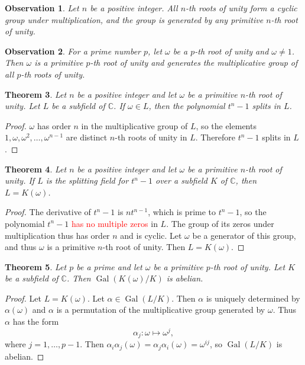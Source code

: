 \documentclass[12pt]{article}
\newtheorem{theorem}{Theorem}
\newtheorem{observation}[theorem]{\textbf{Observation}}
\newcommand{\Gal}{\operatorname{Gal}}
\begin{document}
\begin{observation}
    Let $n$ be a positive integer. All $n$-th roots of unity form a cyclic
    group under multiplication, and the group is generated by any primitive
    $n$-th
    root of unity.
\end{observation}

\begin{observation}
    For a prime number $p$, let $\omega$ be a $p$-th root of unity and $\omega
        \neq 1$. Then $\omega$ is a primitive $p$-th root of unity and
    generates the
    multiplicative group of all $p$-th roots of unity.
\end{observation}

\begin{theorem} \label{thm:unity-1}
    Let $n$ be a positive integer and let $\omega$ be a primitive $n$-th root
    of unity. Let $L$ be a subfield of $\mathbb C$. If $\omega \in L$, then the
    polynomial $t^n - 1$ splits in $L$.
\end{theorem}
\begin{proof}
    $\omega$ has order $n$ in the multiplicative group of $L$, so the elements
    $1, \omega, \omega^2, \ldots, \omega^{n-1}$ are distinct $n$-th roots of
    unity
    in $L$. Therefore $t^n-1$ splits in $L$.
\end{proof}

\begin{theorem} \label{thm:unity-2}
    Let $n$ be a positive integer and let $\omega$ be a primitive $n$-th root
    of unity. If $L$ is the splitting field for $t^n - 1$ over a subfield $K$
    of
    $\mathbb C$, then $L = K(\omega)$.
\end{theorem}

\begin{proof}
    The derivative of $t^n-1$ is $n t^{n-1}$, which is prime to $t^n-1$, so the
    polynomial $t^n-1$ \textcolor{red}{has no multiple zeros} in $L$. The group
    of
    its zeros under multiplication thus has order $n$ and is cyclic. Let
    $\omega$
    be a generator of this group, and thus $\omega$ is a primitive $n$-th root
    of
    unity. Then $L=K(\omega)$.
\end{proof}

\begin{theorem} \label{thm:radical-1}
    Let $p$ be a prime and let $\omega$ be a primitive $p$-th root of unity.
    Let $K$ be a subfield of $\mathbb C$. Then $\Gal(K(\omega) / K)$ is
    abelian.
\end{theorem}
\begin{proof}
    Let $L = K(\omega)$.  Let $\alpha \in \Gal(L / K)$. Then $\alpha$ is
    uniquely
    determined by $\alpha(\omega)$ and $\alpha$ is a permutation of the
    multiplicative group generated by $\omega$. Thus $\alpha$ has the form
    $$
        \alpha_j: \omega \mapsto \omega^j,
    $$
    where $j=1,\dots,p-1$. Then $\alpha_i \alpha_j (\omega) = \alpha_j \alpha_i
        (\omega) = \omega^{i j}$, so $ \Gal(L / K)$ is abelian.
\end{proof}
\end{document}
